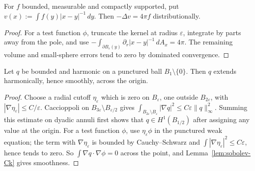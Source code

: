 \begin{proposition}\label{prop:newtonian}
For $f$ bounded, measurable and compactly supported, put
$v(x):=\int f(y)|x-y|^{-1}\,dy$.  Then $-\Delta v=4\pi f$ distributionally.
\end{proposition}

\begin{proof}
For a test function $\phi$, truncate the kernel at radius $\varepsilon$,
integrate by parts away from the pole, and use
$-\int_{\partial B_\varepsilon(y)}\partial_r|x-y|^{-1}\,dA_x=4\pi$.  The
remaining volume and small-sphere errors tend to zero by dominated
convergence.
\end{proof}

\begin{proposition}\label{prop:kelvin-removable}
Let $q$ be bounded and harmonic on a punctured ball $B_1\setminus\{0\}$.
Then $q$ extends harmonically, hence smoothly, across the origin.
\end{proposition}

\begin{proof}
Choose a radial cutoff $\eta_\varepsilon$ which is zero on $B_\varepsilon$,
one outside $B_{2\varepsilon}$, with
$|\nabla\eta_\varepsilon|\le C/\varepsilon$.  Caccioppoli on
$B_{3\varepsilon}\setminus B_{\varepsilon/2}$ gives
$\int_{B_{2\varepsilon}\setminus B_\varepsilon}|\nabla q|^2
 \le C\varepsilon\|q\|_\infty^2$.  Summing this estimate on dyadic annuli
first shows that $q\in H^1(B_{1/2})$ after assigning any value at the origin.
For a test function $\phi$, use $\eta_\varepsilon\phi$ in the punctured weak
equation; the term with
$\nabla\eta_\varepsilon$ is bounded by Cauchy--Schwarz and
$\int|\nabla\eta_\varepsilon|^2\le C\varepsilon$, hence tends to zero.  So
$\int\nabla q\cdot\nabla\phi=0$ across the point, and
Lemma~\ref{lem:sobolev-Ck} gives smoothness.
\end{proof}

